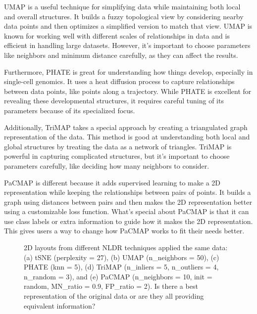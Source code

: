 \documentclass[
  12pt]{article}
\begin{document}
UMAP \citep{Leland2018} is a useful technique for simplifying data while
maintaining both local and overall structures. It builds a fuzzy
topological view by considering nearby data points and then optimizes a
simplified version to match that view. UMAP is known for working well
with different scales of relationships in data and is efficient in
handling large datasets. However, it's important to choose parameters
like neighbors and minimum distance carefully, as they can affect the
results.

Furthermore, PHATE \citep{article03} is great for understanding how
things develop, especially in single-cell genomics. It uses a heat
diffusion process to capture relationships between data points, like
points along a trajectory. While PHATE is excellent for revealing these
developmental structures, it requires careful tuning of its parameters
because of its specialized focus.

Additionally, TriMAP \citep{article02} takes a special approach by
creating a triangulated graph representation of the data. This method is
good at understanding both local and global structures by treating the
data as a network of triangles. TriMAP is powerful in capturing
complicated structures, but it's important to choose parameters
carefully, like deciding how many neighbors to consider.

PaCMAP \citep{Yingfan2021} is different because it adds supervised
learning to make a 2D representation while keeping the relationships
between pairs of points. It builds a graph using distances between pairs
and then makes the 2D representation better using a customizable loss
function. What's special about PaCMAP is that it can use class labels or
extra information to guide how it makes the 2D representation. This
gives users a way to change how PaCMAP works to fit their needs better.

\begin{figure}


\caption{\label{fig-nldervis}2D layouts from different NLDR techniques
applied the same data: (a) tSNE (perplexity = 27), (b) UMAP
(n\_neighbors = 50), (c) PHATE (knn = 5), (d) TriMAP (n\_inliers = 5,
n\_outliers = 4, n\_random = 3), and (e) PaCMAP (n\_neighbors = 10, init
= random, MN\_ratio = 0.9, FP\_ratio = 2). Is there a best
representation of the original data or are they all providing equivalent
information?}

\end{figure}%
\end{document}

